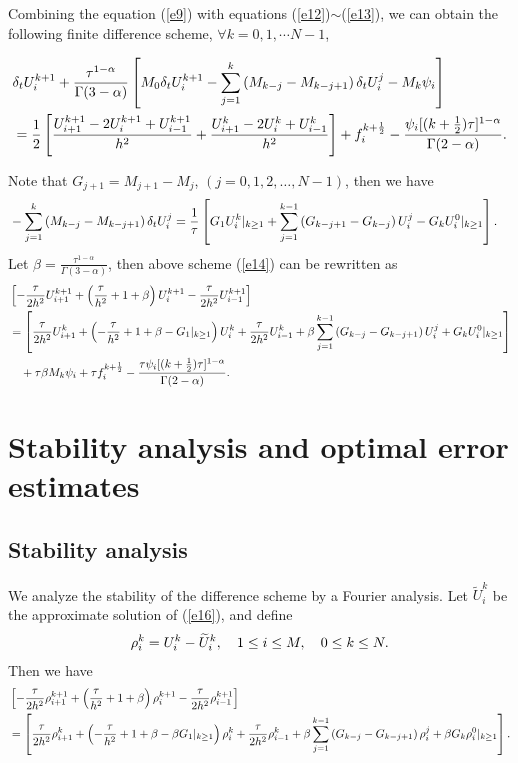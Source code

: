 \documentclass[3p,times]{elsarticle}
\begin{document}
Combining the equation (\ref{e9}) with equations (\ref{e12})$\sim$(\ref{e13}), we can obtain the following finite difference scheme, $\forall k=0,1,\cdots N-1$,

\begin{equation}\label{e14}
\aligned
&\delta_tU_{i}^{k+1}+\frac{\tau^{1-\alpha}}{\Gamma(3-\alpha)}\left[M_0\delta_tU_i^{k+1}-\sum\limits_{j=1}^k\left(M_{k-j}-M_{k-j+1}\right)\delta_tU_i^j-M_k\psi_i\right]\\
&=\frac{1}{2}\left[\frac{U_{i+1}^{k+1}-2U_i^{k+1}+U_{i-1}^{k+1}}{h^2}+\frac{U_{i+1}^{k}-2U_i^k+U_{i-1}^{k}}{h^2}\right]+f_i^{k+\frac{1}{2}}-\frac{\psi_i[(k+\frac{1}{2})\tau]^{1-\alpha}}{\Gamma(2-\alpha)}.
\endaligned
\end{equation}

Note that $G_{j+1}=M_{j+1}-M_j$, $(j=0,1,2,\ldots,N-1)$, then we have
\begin{equation}\label{e15}
\aligned
&-\sum\limits_{j=1}^k\left(M_{k-j}-M_{k-j+1}\right)\delta_tU_i^j
=\frac{1}{\tau}\left[G_1U_i^k|_{k\geq1}+\sum\limits_{j=1}^{k-1}\left(G_{k-j+1}-G_{k-j}\right)U_i^j-G_kU_i^0|_{k\geq1}\right].
\endaligned
\end{equation}
Let $\beta=\frac{\tau^{1-\alpha}}{\Gamma(3-\alpha)}$, then above scheme (\ref{e14}) can be rewritten as
\begin{equation}\label{e16}
\aligned
&\left[-\frac{\tau}{2h^2}U_{i+1}^{k+1}+\left(\frac{\tau}{h^2}+1+\beta\right)U_i^{k+1}-\frac{\tau}{2h^2}U_{i-1}^{k+1}\right]\\
&=\left[\frac{\tau}{2h^2}U_{i+1}^{k}+\left(-\frac{\tau}{h^2}+1+\beta-G_1|_{k\geq1}\right)U_i^{k}+\frac{\tau}{2h^2}U_{i-1}^{k}+\beta\sum\limits_{j=1}^{k-1}\left(G_{k-j}-G_{k-j+1}\right)U_i^j+G_kU_i^0|_{k\geq1}\right]\\
&\quad+\tau\beta M_k\psi_i+\tau f_i^{k+\frac{1}{2}}-\frac{\tau\psi_i[(k+\frac{1}{2})\tau]^{1-\alpha}}{\Gamma(2-\alpha)}.
\endaligned
\end{equation}
\section{Stability analysis and optimal error estimates}
\subsection{Stability analysis}
We analyze the stability of the difference scheme by a Fourier analysis. Let $\widetilde{U}_i^k$ be the approximate solution of (\ref{e16}), and define
\begin{equation*}
\aligned
\rho_i^k=U_i^k-\widetilde{U}_i^k,\quad 1\leq i\leq M,\quad 0\leq k\leq N.
\endaligned
\end{equation*}
Then we have
\begin{equation}\label{e17}
\aligned
&\left[-\frac{\tau}{2h^2}\rho_{i+1}^{k+1}+\left(\frac{\tau}{h^2}+1+\beta\right)\rho_i^{k+1}-\frac{\tau}{2h^2}\rho_{i-1}^{k+1}\right]\\
&=\left[\frac{\tau}{2h^2}\rho_{i+1}^{k}+\left(-\frac{\tau}{h^2}+1+\beta-\beta G_1|_{k\geq1}\right)\rho_i^{k}+\frac{\tau}{2h^2}\rho_{i-1}^{k}+\beta\sum\limits_{j=1}^{k-1}\left(G_{k-j}-G_{k-j+1}\right)\rho_i^j+\beta G_k\rho_i^0|_{k\geq1}\right].
\endaligned
\end{equation}
\end{document}

